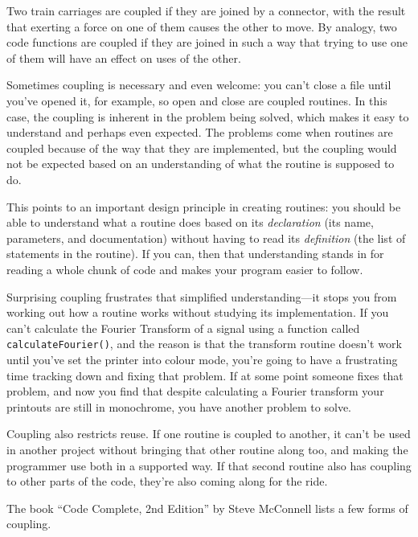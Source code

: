 \documentclass[a4paper]{article}
\begin{document}
Two train carriages are coupled if they are joined by a connector, with the result that exerting a force on one of them causes the other to move.
By analogy, two code functions are coupled if they are joined in such a way that trying to use one of them will have an effect on uses of the other.

Sometimes coupling is necessary and even welcome: you can't close a file until you've opened it, for example, so open and close are coupled routines.
In this case, the coupling is inherent in the problem being solved, which makes it easy to understand and perhaps even expected.
The problems come when routines are coupled because of the way that they are implemented, but the coupling would not be expected based on an understanding of what the routine is supposed to do.

This points to an important design principle in creating routines: you should be able to understand what a routine does based on its \textit{declaration} (its name, parameters, and documentation) without having to read its \textit{definition} (the list of statements in the routine).
If you can, then that understanding stands in for reading a whole chunk of code and makes your program easier to follow.

Surprising coupling frustrates that simplified understanding---it stops you from working out how a routine works without studying its implementation.
If you can't calculate the Fourier Transform of a signal using a function called \texttt{calculateFourier()}, and the reason is that the transform routine doesn't work until you've set the printer into colour mode, you're going to have a frustrating time tracking down and fixing that problem.
If at some point someone fixes that problem, and now you find that despite calculating a Fourier transform your printouts are still in monochrome, you have another problem to solve.

Coupling also restricts reuse.
If one routine is coupled to another, it can't be used in another project without bringing that other routine along too, and making the programmer use both in a supported way.
If that second routine also has coupling to other parts of the code, they're also coming along for the ride.

The book ``Code Complete, 2nd Edition'' by Steve McConnell\cite{cc2e} lists a few forms of coupling.
\end{document}
